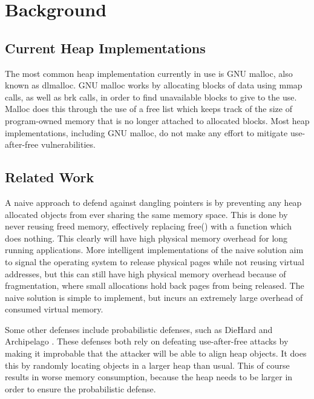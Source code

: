 \documentclass[conference]{IEEEtran}
\begin{document}
\section{Background}

\subsection{Current Heap Implementations}
The most common heap implementation currently in use is GNU malloc, also 
known as dlmalloc. GNU malloc works by allocating blocks of data using mmap 
calls, as well as brk calls, in order to find unavailable blocks to give to 
the use. Malloc does this through the use of a free list which keeps track 
of the size of program-owned memory that is no longer attached to allocated 
blocks.  Most heap implementations, including GNU malloc, do not make any effort to mitigate use-after-free vulnerabilities. 

\subsection{Related Work}
A naive approach to defend against dangling pointers is by preventing any 
heap allocated objects from ever sharing the same memory space. This is done 
by never reusing freed memory, effectively replacing free() with a function 
which does nothing. This clearly will have high physical memory overhead for long running applications. More intelligent implementations of the naive solution aim to signal the operating system to release physical pages while not reusing virtual addresses, but this can still have high physical memory overhead because of fragmentation, where small allocations hold back pages from being released.  The naive solution is simple to implement, but incurs an extremely large overhead of consumed virtual memory.

Some other defenses include probabilistic defenses, such as DieHard \cite{b2}
and Archipelago \cite{b3}. These defenses both rely on defeating 
use-after-free attacks by making it improbable that the attacker will be able 
to align heap objects. It does this by randomly locating objects in a larger 
heap than usual. This of course results in worse memory consumption, because 
the heap needs to be larger in order to ensure the probabilistic defense.
\end{document}
